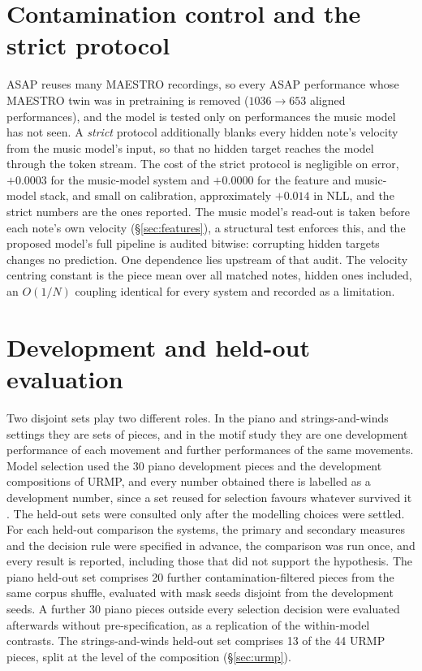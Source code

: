 \documentclass[11pt,a4paper]{report}
\newcommand{\nPieces}{30}
\newcommand{\nConfPieces}{20}
\begin{document}
\section{Contamination control and the strict protocol}\label{sec:contam}
ASAP reuses many MAESTRO recordings, so every ASAP performance whose MAESTRO
twin was in pretraining is removed ($1036 \to 653$ aligned performances), and
the model is tested only on performances the music model has not seen. A
\emph{strict} protocol additionally blanks every hidden note's velocity from
the music model's input, so that no hidden target reaches the model through
the token stream. The cost of the strict protocol is negligible on error,
$+0.0003$ for the music-model system and $+0.0000$ for the feature and
music-model stack, and small on calibration, approximately $+0.014$ in NLL,
and the strict numbers are the ones reported. The music model's read-out is
taken before each note's own velocity (\S\ref{sec:features}), a structural
test enforces this, and the proposed model's full pipeline is audited
bitwise: corrupting hidden targets changes no prediction. One dependence
lies upstream of that audit. The velocity centring constant is the piece
mean over all matched notes, hidden ones included, an $O(1/N)$ coupling identical for every
system and recorded as a limitation.

\section{Development and held-out evaluation}\label{sec:hygiene}
Two disjoint sets play two different roles. In the piano and
strings-and-winds settings they are sets of pieces, and in the motif study
they are one development performance of each movement and further
performances of the same movements. Model selection used the \nPieces{}
piano development pieces and the development compositions of URMP, and every
number obtained there is labelled as a development number, since a set
reused for selection favours whatever survived it \cite{nosek2018}. The
held-out sets were consulted only after the modelling choices were settled.
For each held-out comparison the systems, the primary and secondary measures
and the decision rule were specified in advance, the comparison was run
once, and every result is reported, including those that did not support
the hypothesis. The piano held-out set comprises \nConfPieces{} further
contamination-filtered pieces from the same corpus shuffle, evaluated with
mask seeds disjoint from the development seeds. A further 30 piano pieces
outside every selection decision were evaluated afterwards without
pre-specification, as a replication of the within-model contrasts. The
strings-and-winds held-out set comprises 13 of the 44 URMP pieces, split at
the level of the composition (\S\ref{sec:urmp}).
\end{document}
